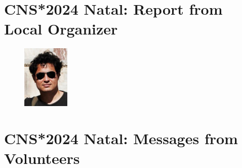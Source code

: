 \section*{CNS*2024 Natal: Report from Local Organizer}%
\begin{figure}
  \includegraphics[width=0.2\textwidth]{images/Cesar}
\end{figure}

\lipsum[1-3]

\clearpage
\section*{CNS*2024 Natal: Messages from Volunteers}%
\lipsum[1-3]

\clearpage

